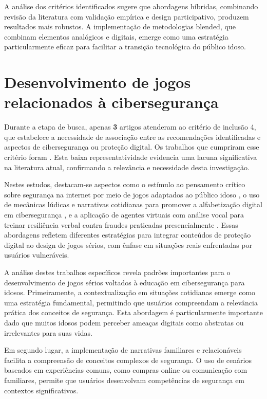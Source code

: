 \begin{table}[H]
A análise dos critérios identificados sugere que abordagens híbridas, combinando revisão da literatura com validação empírica e design participativo, produzem resultados mais robustos. A implementação de metodologias blended, que combinam elementos analógicos e digitais, emerge como uma estratégia particularmente eficaz para facilitar a transição tecnológica do público idoso.


\section{Desenvolvimento de jogos relacionados à cibersegurança}
\label{sec:ciberseguranca}

Durante a etapa de busca, apenas \textbf{3} artigos atenderam ao critério de inclusão 4, que estabelece a necessidade de associação entre as recomendações identificadas e aspectos de cibersegurança ou proteção digital. Os trabalhos que cumpriram esse critério foram \cite{machado2017learning, bernardino2021serious, van2020serious}. Esta baixa representatividade evidencia uma lacuna significativa na literatura atual, confirmando a relevância e necessidade desta investigação.

Nestes estudos, destacam-se aspectos como o estímulo ao pensamento crítico sobre segurança na internet por meio de jogos adaptados ao público idoso \cite{machado2017learning}, o uso de mecânicas lúdicas e narrativas cotidianas para promover a alfabetização digital em cibersegurança \cite{bernardino2021serious}, e a aplicação de agentes virtuais com análise vocal para treinar resiliência verbal contra fraudes praticadas presencialmente \cite{van2020serious}. Essas abordagens refletem diferentes estratégias para integrar conteúdos de proteção digital ao design de jogos sérios, com ênfase em situações reais enfrentadas por usuários vulneráveis.

A análise destes trabalhos específicos revela padrões importantes para o desenvolvimento de jogos sérios voltados à educação em cibersegurança para idosos. Primeiramente, a contextualização em situações cotidianas emerge como uma estratégia fundamental, permitindo que usuários compreendam a relevância prática dos conceitos de segurança. Esta abordagem é particularmente importante dado que muitos idosos podem perceber ameaças digitais como abstratas ou irrelevantes para suas vidas.

Em segundo lugar, a implementação de narrativas familiares e relacionáveis facilita a compreensão de conceitos complexos de segurança. O uso de cenários baseados em experiências comuns, como compras online ou comunicação com familiares, permite que usuários desenvolvam competências de segurança em contextos significativos.


\end{table}
